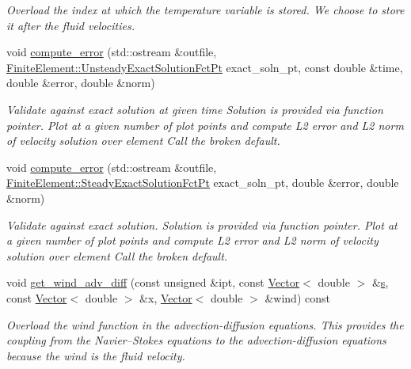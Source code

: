 \begin{DoxyCompactItemize}
\begin{DoxyCompactList}\small\item\em Overload the index at which the temperature variable is stored. We choose to store it after the fluid velocities. \end{DoxyCompactList}\item 
void \hyperlink{classoomph_1_1BuoyantQCrouzeixRaviartElement_a53d343548b707c62e9f11a04d2dda986}{compute\+\_\+error} (std\+::ostream \&outfile, \hyperlink{classoomph_1_1FiniteElement_ad4ecf2b61b158a4b4d351a60d23c633e}{Finite\+Element\+::\+Unsteady\+Exact\+Solution\+Fct\+Pt} exact\+\_\+soln\+\_\+pt, const double \&time, double \&error, double \&norm)
\begin{DoxyCompactList}\small\item\em Validate against exact solution at given time Solution is provided via function pointer. Plot at a given number of plot points and compute L2 error and L2 norm of velocity solution over element Call the broken default. \end{DoxyCompactList}\item 
void \hyperlink{classoomph_1_1BuoyantQCrouzeixRaviartElement_a2aa63b1b2ec1130835ee87cbf52cc086}{compute\+\_\+error} (std\+::ostream \&outfile, \hyperlink{classoomph_1_1FiniteElement_a690fd33af26cc3e84f39bba6d5a85202}{Finite\+Element\+::\+Steady\+Exact\+Solution\+Fct\+Pt} exact\+\_\+soln\+\_\+pt, double \&error, double \&norm)
\begin{DoxyCompactList}\small\item\em Validate against exact solution. Solution is provided via function pointer. Plot at a given number of plot points and compute L2 error and L2 norm of velocity solution over element Call the broken default. \end{DoxyCompactList}\item 
void \hyperlink{classoomph_1_1BuoyantQCrouzeixRaviartElement_ade5820ae7c44a9371dcc348ca5a3ab1c}{get\+\_\+wind\+\_\+adv\+\_\+diff} (const unsigned \&ipt, const \hyperlink{classoomph_1_1Vector}{Vector}$<$ double $>$ \&\hyperlink{cfortran_8h_ab7123126e4885ef647dd9c6e3807a21c}{s}, const \hyperlink{classoomph_1_1Vector}{Vector}$<$ double $>$ \&x, \hyperlink{classoomph_1_1Vector}{Vector}$<$ double $>$ \&wind) const
\begin{DoxyCompactList}\small\item\em Overload the wind function in the advection-\/diffusion equations. This provides the coupling from the Navier--Stokes equations to the advection-\/diffusion equations because the wind is the fluid velocity. \end{DoxyCompactList}\item 

\end{DoxyCompactItemize}
